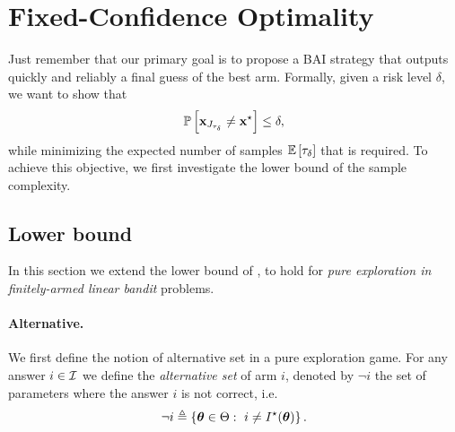 \section{Fixed-Confidence Optimality}\label{sec:lgc.complexity}

Just remember that our primary goal is to propose a BAI strategy that outputs quickly and reliably a final guess of the best arm. Formally, given a risk level $\delta$, we want to show that
\[
  \mathbb{P}\left[{\bf x}_{J_{\tau_\delta}}\neq {\bf x}^\star\right] \leq \delta,
\]
while minimizing the expected number of samples $\mathbb{E}\left[\tau_\delta\right]$ that is required. To achieve this objective, we first investigate the lower bound of the sample complexity.

\subsection{Lower bound}\label{sec:lgc.complexity.lb}

In this section we extend the lower bound of \citet{garivier2016tracknstop}, to hold for \emph{pure exploration in finitely-armed linear bandit} problems.

\paragraph{Alternative.}
We first define the notion of \gls{alternative set} in a pure exploration game. For any answer $i\in\mathcal{I}$ we define the \emph{alternative set} of arm $i$, denoted by $\neg i$ the set of parameters where the answer $i$ is not correct, i.e.
\[
    \neg i \triangleq \{{\boldsymbol \theta}\in\Theta:\ i\neq I^\star({\boldsymbol \theta})\}\,.
\]


